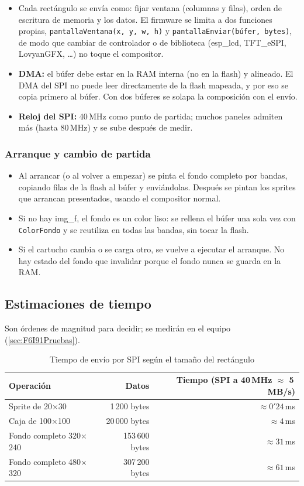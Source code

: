 \begin{itemize}
	\item Cada rectángulo se envía como: fijar ventana (columnas y filas), orden de escritura de memoria y los datos. El firmware se limita a dos funciones propias, \texttt{pantallaVentana(x, y, w, h)} y \texttt{pantallaEnviar(búfer, bytes)}, de modo que cambiar de controlador o de biblioteca (esp\_lcd, TFT\_eSPI, LovyanGFX, \ldots) no toque el compositor.
	\item \textbf{DMA:} el búfer debe estar en la RAM interna (no en la flash) y alineado. El DMA del SPI no puede leer directamente de la flash mapeada, y por eso se copia primero al búfer. Con dos búferes se solapa la composición con el envío.
	\item \textbf{Reloj del SPI:} 40\,MHz como punto de partida; muchos paneles admiten más (hasta 80\,MHz) y se sube después de medir.
\end{itemize}

\subsubsection{Arranque y cambio de partida}

\begin{itemize}
	\item Al arrancar (o al volver a empezar) se pinta el fondo completo por bandas, copiando filas de la flash al búfer y enviándolas. Después se pintan los sprites que arrancan presentados, usando el compositor normal.
	\item Si no hay img\_f, el fondo es un color liso: se rellena el búfer una sola vez con \texttt{ColorFondo} y se reutiliza en todas las bandas, sin tocar la flash.
	\item Si el cartucho cambia o se carga otro, se vuelve a ejecutar el arranque. No hay estado del fondo que invalidar porque el fondo nunca se guarda en la RAM.
\end{itemize}

\subsection{Estimaciones de tiempo}
\label{sec:F6I91Tiempos}

Son órdenes de magnitud para decidir; se medirán en el equipo (\ref{sec:F6I91Pruebas}).

\begin{table}[H]
	\centering
	\begin{tabular}{lrr}
		\toprule
		Operación & Datos & Tiempo (SPI a 40\,MHz $\approx$ 5\,MB/s) \\
		\midrule
		Sprite de 20$\times$30 & 1\,200 bytes & $\approx 0'24$\,ms \\
		Caja de 100$\times$100 & 20\,000 bytes & $\approx 4$\,ms \\
		Fondo completo 320$\times$240 & 153\,600 bytes & $\approx 31$\,ms \\
		Fondo completo 480$\times$320 & 307\,200 bytes & $\approx 61$\,ms \\
		\bottomrule
	\end{tabular}
	\caption{Tiempo de envío por SPI según el tamaño del rectángulo}
	\label{tab:F6I91Tiempos}
\end{table}


